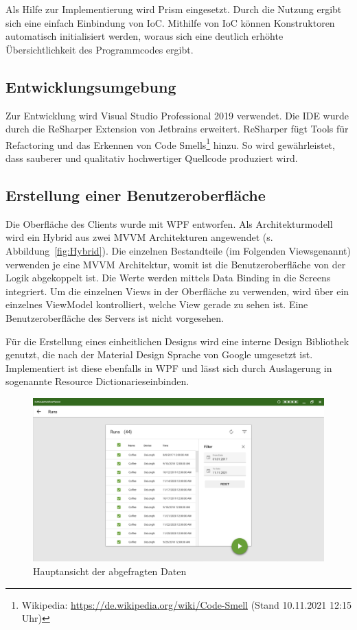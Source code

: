 Als Hilfe zur Implementierung wird {\acs{Prism}} eingesetzt. Durch die Nutzung ergibt sich eine einfach Einbindung von {\acs{IoC}}. Mithilfe von {\acs{IoC}} können Konstruktoren automatisch initialisiert werden, woraus sich eine deutlich erhöhte Übersichtlichkeit des Programmcodes ergibt.

\subsection{Entwicklungsumgebung}
\label{sec:Entwicklungsumgebung}
Zur Entwicklung wird Visual Studio Professional 2019 verwendet. Die IDE wurde durch die ReSharper Extension von Jetbrains erweitert. ReSharper fügt Tools für Refactoring und das Erkennen von Code Smells\footnote{Wikipedia: \url{https://de.wikipedia.org/wiki/Code-Smell} (Stand 10.11.2021 12:15 Uhr)} hinzu. So wird gewährleistet, dass sauberer und qualitativ hochwertiger Quellcode produziert wird.

\subsection{Erstellung einer Benutzeroberfläche}
\label{sec:ErstellungEinerBenutzeroberfläche}
Die Oberfläche des Clients wurde mit {\acs{WPF}} entworfen. Als Architekturmodell wird ein Hybrid aus zwei {\acs{MVVM}} Architekturen angewendet (s. Abbildung~\ref{fig:Hybrid}). Die einzelnen Bestandteile (im Folgenden \glqq Views\grqq \space genannt) verwenden je eine {\acs{MVVM}} Architektur, womit ist die Benutzeroberfläche von der Logik abgekoppelt ist. Die Werte werden mittels Data Binding in die Screens integriert. Um die einzelnen Views in der Oberfläche zu verwenden, wird über ein einzelnes ViewModel kontrolliert, welche View gerade zu sehen ist. Eine Benutzeroberfläche des Servers ist nicht vorgesehen.

Für die Erstellung eines einheitlichen Designs wird eine {\betriebNameKzf} interne Design Bibliothek genutzt, die nach der Material Design Sprache von Google umgesetzt ist. Implementiert ist diese ebenfalls in {\acs{WPF}} und lässt sich durch Auslagerung in sogenannte \glqq Resource Dictionaries\grqq \space einbinden.

\begin{figure}[htb]
	\centering
	\includegraphics[scale=0.5]{Bilder/RunsAnsicht.png}
	\caption{Hauptansicht der abgefragten Daten}
	\label{fig:Runs}
\end{figure} 

